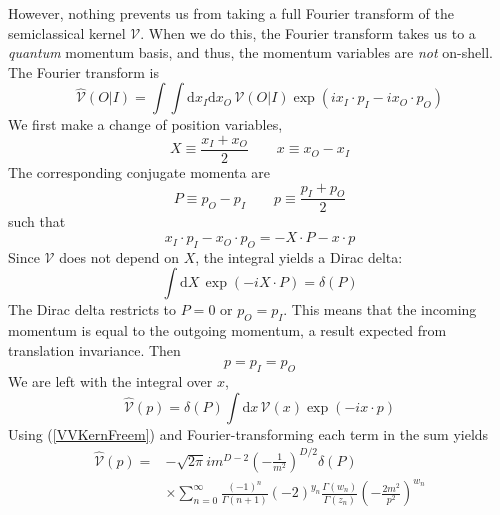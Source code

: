 However, nothing prevents us from taking a full Fourier transform of the semiclassical kernel $\mathcal{V}$. When we do this, the Fourier transform takes us to a \textit{quantum} momentum basis, and thus, the momentum variables are \textit{not} on-shell. The Fourier transform is
\begin{equation}
	\widehat{\mathcal{V}}(O|I) = \int \int \mathrm{d}x_{I} \mathrm{d}x_{O} \, \mathcal{V}(O|I) \exp{\left(i x_{I} \cdot p_{I} - i x_{O} \cdot p_{O} \right)}
\end{equation}
We first make a change of position variables,
\begin{equation}
	X \equiv \frac{x_{I} + x_{O}}{2} \qquad x \equiv x_{O} - x_{I}
\end{equation}
The corresponding conjugate momenta are
\begin{equation}
	P \equiv p_{O} - p_{I} \qquad p \equiv \frac{p_{I} + p_{O}}{2}
\end{equation}
such that
\begin{equation}
	x_{I} \cdot p_{I} - x_{O} \cdot p_{O} = - X \cdot P - x \cdot p
\end{equation}
Since $\mathcal{V}$ does not depend on $X$, the integral yields a Dirac delta:
\begin{equation}
	\int \mathrm{d}X \, \exp{\left( -i X \cdot P \right)} = \delta(P)
\end{equation}
The Dirac delta restricts to $P = 0$ or $p_{O} = p_{I}$. This means that the incoming momentum is equal to the outgoing momentum, a result expected from translation invariance. Then
\begin{equation}
	p = p_{I} = p_{O}
\end{equation}
We are left with the integral over $x$,
\begin{equation}
	\widehat{\mathcal{V}}(p) = \delta(P) \int \mathrm{d}x \, \mathcal{V}(x) \exp{\left( -i x \cdot p \right)}
\end{equation}
Using (\ref{VVKernFreem}) and Fourier-transforming each term in the sum yields
\begin{equation}
\begin{split}
	\widehat{\mathcal{V}}(p) = {}& {- \sqrt{2\pi} i} m^{D-2} \left( - \frac{1}{m^{2}} \right)^{D/2} \delta(P) \\
	&\times \sum_{n = 0}^{\infty} \frac{(-1)^{n}}{\Gamma(n + 1)} (-2)^{y_{n}} \frac{\Gamma(w_{n})}{\Gamma(z_{n})} \left( - \frac{2 m^{2}}{p^{2}} \right)^{w_{n}}
\end{split} \label{VVHatSum}
\end{equation}
